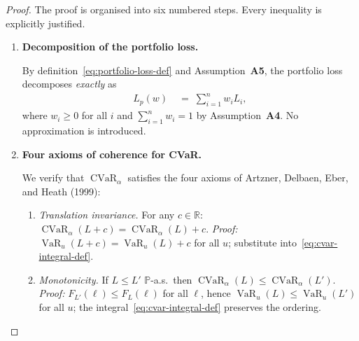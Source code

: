 \documentclass[12pt,openany]{book}
\newcommand{\Prob}{\mathbb{P}}
\newcommand{\bfw}{\mathbf{w}}
\DeclareMathOperator{\CVaR}{CVaR}
\DeclareMathOperator{\VaR}{VaR}
\numberwithin{equation}{chapter}
\theoremstyle{plain}
\theoremstyle{definition}
\theoremstyle{remark}
\def\bfw{w}%
\begin{document}
\begin{proof}
The proof is organised into six numbered steps.  Every
inequality is explicitly justified.

\begin{enumerate}[label=\textbf{Step \arabic*.}, leftmargin=*,
                  widest=Step 6., itemsep=1ex]

  \item \textbf{Decomposition of the portfolio loss.}

        By definition~\eqref{eq:portfolio-loss-def} and
        Assumption~\textbf{A5}, the portfolio loss decomposes
        \emph{exactly} as
        \begin{align}
          L_p(\bfw)
          &\;=\; \sum_{i=1}^n w_i L_i,
          \label{eq:lp-decomp}
        \end{align}
        where $w_i \geq 0$ for all $i$ and $\sum_{i=1}^n w_i = 1$
        by Assumption~\textbf{A4}.  No approximation is introduced.

  \item \textbf{Four axioms of coherence for CVaR.}

        We verify that $\CVaR_\alpha$ satisfies the four axioms of
        Artzner, Delbaen, Eber, and Heath (1999):

        \begin{enumerate}[label=(\alph*), leftmargin=*]

          \item \emph{Translation invariance.}
                For any $c \in \mathbb{R}$:
                $\CVaR_\alpha(L + c) = \CVaR_\alpha(L) + c$.
                \textit{Proof:} $\VaR_u(L+c) = \VaR_u(L)+c$ for
                all $u$; substitute into~\eqref{eq:cvar-integral-def}.

          \item \emph{Monotonicity.}
                If $L \leq L'$ $\Prob$-a.s.\ then
                $\CVaR_\alpha(L) \leq \CVaR_\alpha(L')$.
                \textit{Proof:} $F_{L'}(\ell) \leq F_L(\ell)$ for
                all $\ell$, hence $\VaR_u(L) \leq \VaR_u(L')$ for
                all $u$; the integral~\eqref{eq:cvar-integral-def}
                preserves the ordering.


\end{enumerate}
\end{enumerate}
\end{proof}
\end{document}
